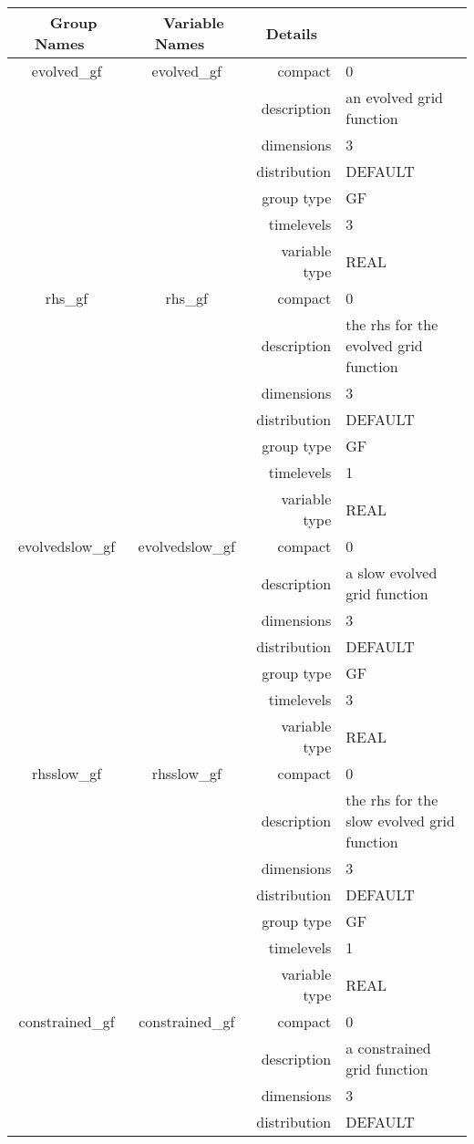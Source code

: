 \begin{tabular*}{150mm}{|c|c@{\extracolsep{\fill}}|rl|} \hline 
~ {\bf Group Names} ~ & ~ {\bf Variable Names} ~  &{\bf Details} ~ & ~\\ 
\hline 
evolved\_gf & evolved\_gf & compact & 0 \\ 
 &  & description & an evolved grid function \\ 
 &  & dimensions & 3 \\ 
 &  & distribution & DEFAULT \\ 
 &  & group type & GF \\ 
 &  & timelevels & 3 \\ 
 &  & variable type & REAL \\ 
\hline 
rhs\_gf & rhs\_gf & compact & 0 \\ 
 &  & description & the rhs for the evolved grid function \\ 
 &  & dimensions & 3 \\ 
 &  & distribution & DEFAULT \\ 
 &  & group type & GF \\ 
 &  & timelevels & 1 \\ 
 &  & variable type & REAL \\ 
\hline 
evolvedslow\_gf & evolvedslow\_gf & compact & 0 \\ 
 &  & description & a slow evolved grid function \\ 
 &  & dimensions & 3 \\ 
 &  & distribution & DEFAULT \\ 
 &  & group type & GF \\ 
 &  & timelevels & 3 \\ 
 &  & variable type & REAL \\ 
\hline 
rhsslow\_gf & rhsslow\_gf & compact & 0 \\ 
 &  & description & the rhs for the slow evolved grid function \\ 
 &  & dimensions & 3 \\ 
 &  & distribution & DEFAULT \\ 
 &  & group type & GF \\ 
 &  & timelevels & 1 \\ 
 &  & variable type & REAL \\ 
\hline 
constrained\_gf & constrained\_gf & compact & 0 \\ 
 &  & description & a constrained grid function \\ 
 &  & dimensions & 3 \\ 
 &  & distribution & DEFAULT \\ 

\end{tabular*}
